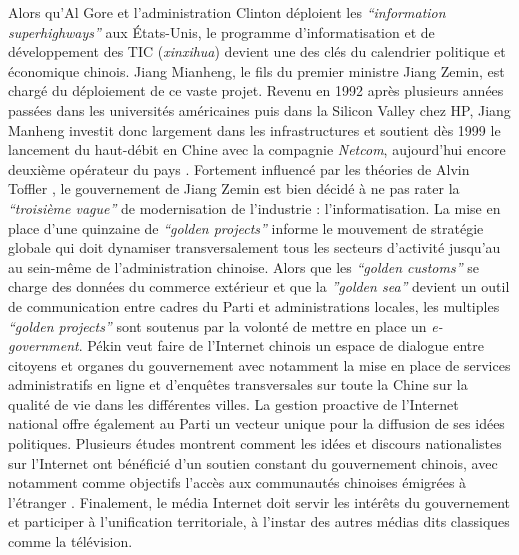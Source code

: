 Alors qu’Al Gore et l’administration Clinton déploient les \textit{“information superhighways”} aux États-Unis, le programme d’informatisation et de développement des TIC (\textit{xinxihua}) devient une des clés du calendrier politique et économique chinois. Jiang Mianheng, le fils du premier ministre Jiang Zemin, est chargé du déploiement de ce vaste projet. Revenu en 1992 après plusieurs années passées dans les universités américaines puis dans la Silicon Valley chez HP, Jiang Manheng investit donc largement dans les infrastructures et soutient dès 1999 le lancement du haut-débit en Chine avec la compagnie \textit{Netcom}, aujourd’hui encore deuxième opérateur du pays \citep{Dai2007}. Fortement influencé par les théories de Alvin Toffler \citep{Tsui2007}, le gouvernement de Jiang Zemin est bien décidé à ne pas rater la \textit{“troisième vague”} de modernisation de l’industrie : l’informatisation. La mise en place d’une quinzaine de \textit{“golden projects”} informe le mouvement de stratégie globale qui doit dynamiser transversalement tous les secteurs d’activité jusqu’au au sein-même de l’administration chinoise. Alors que les \textit{“golden customs”} se charge des données du commerce extérieur et que la \textit{”golden sea”} devient un outil de communication entre cadres du Parti et administrations locales, les multiples \textit{“golden projects”} sont soutenus par la volonté de mettre en place un \textit{e-government}. Pékin veut faire de l’Internet chinois un espace de dialogue entre citoyens et organes du gouvernement avec notamment la mise en place de services administratifs en ligne et d’enquêtes transversales sur toute la Chine sur la qualité de vie dans les différentes villes. La gestion proactive de l’Internet national offre également au Parti un vecteur unique pour la diffusion de ses idées politiques. Plusieurs études montrent comment les idées et discours nationalistes sur l’Internet ont bénéficié d’un soutien constant du gouvernement chinois, avec notamment comme objectifs l’accès aux communautés chinoises émigrées à l’étranger \citep{Hughes2000}. Finalement, le média Internet doit servir les intérêts du gouvernement et participer à l’unification territoriale, à l’instar des autres médias dits classiques comme la télévision.

